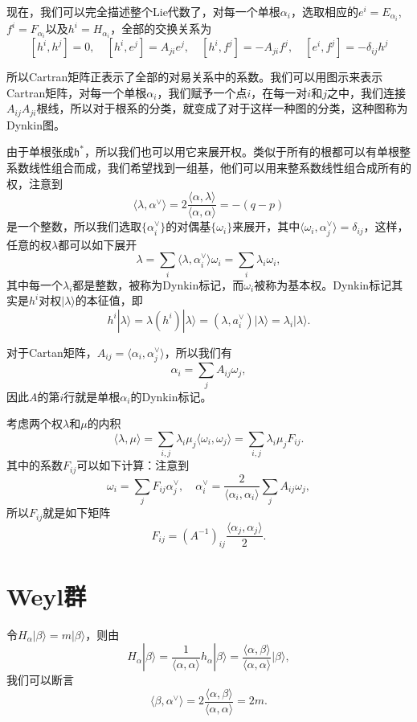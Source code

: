 \documentclass[9pt]{extarticle}
\begin{document}
\para 现在，我们可以完全描述整个Lie代数了，对每一个单根$\alpha_i$，选取相应的$e^i=E_{\alpha_i}$, $f^{i}=F_{\alpha_i}$以及$h^i=H_{\alpha_i}$，全部的交换关系为
\[
	[h^i,h^j]=0,\quad [h^i,e^j]=A_{ji}e^j,\quad [h^i,f^j]=-A_{ji}f^j,\quad [e^i,f^j]=-\delta_{ij}h^j
\]

所以Cartran矩阵正表示了全部的对易关系中的系数。我们可以用图示来表示Cartran矩阵，对每一个单根$\alpha_i$，我们赋予一个点$i$，在每一对$i$和$j$之中，我们连接$A_{ij}A_{ji}$根线，所以对于根系的分类，就变成了对于这样一种图的分类，这种图称为Dynkin图。

\para 由于单根张成$\mathfrak{h}^*$，所以我们也可以用它来展开权。类似于所有的根都可以有单根整系数线性组合而成，我们希望找到一组基，他们可以用来整系数线性组合成所有的权，注意到
\[
	\langle\lambda,\alpha^\vee\rangle=2\frac{\langle\alpha,\lambda\rangle}{\langle \alpha,\alpha\rangle}=-(q-p)
\]
是一个整数，所以我们选取$\{\alpha_i^\vee\}$的对偶基$\{\omega_i\}$来展开，其中$\langle \omega_i,\alpha_j^\vee\rangle=\delta_{ij}$，这样，任意的权$\lambda$都可以如下展开
\[
	\lambda=\sum_i \langle \lambda,\alpha_i^\vee\rangle \omega_i=\sum_i \lambda_i \omega_i,
\]
其中每一个$\lambda_i$都是整数，被称为Dynkin标记，而$\omega_i$被称为基本权。Dynkin标记其实是$h^i$对权$|\lambda \rangle$的本征值，即
\[
	h^i|\lambda \rangle=\lambda(h^i)|\lambda \rangle=(\lambda,a_i^\vee)|\lambda \rangle=\lambda_i|\lambda \rangle.
\]

对于Cartan矩阵，$A_{ij}=\langle \alpha_i,\alpha^\vee_j\rangle$，所以我们有
\[
	\alpha_i=\sum_j A_{ij}\omega_j,
\]
因此$A$的第$i$行就是单根$\alpha_i$的Dynkin标记。

\para 考虑两个权$\lambda$和$\mu$的内积
\[
	\langle \lambda,\mu\rangle=\sum_{i,j}\lambda_i\mu_j\langle \omega_i,\omega_j\rangle=\sum_{i,j}\lambda_i\mu_j F_{ij}.
\]
其中的系数$F_{ij}$可以如下计算：注意到
\[
	\omega_i=\sum_j F_{ij} \alpha_j^\vee,\quad \alpha_i^\vee=\frac{2}{\langle \alpha_i,\alpha_i\rangle}\sum_j A_{ij}\omega_j,
\]
所以$F_{ij}$就是如下矩阵
\[
	F_{ij}=(A^{-1})_{ij}\frac{\langle \alpha_j,\alpha_j\rangle}{2}.
\]

\section{Weyl群}

令$H_\alpha|\beta\rangle = m|\beta\rangle$，则由
\[
	H_\alpha|\beta\rangle = \frac{1}{\langle \alpha,\alpha \rangle}h_\alpha|\beta\rangle=\frac{\langle\alpha,\beta\rangle}{\langle \alpha,\alpha \rangle}|\beta\rangle,
\]
我们可以断言
\[
	\langle\beta,\alpha^\vee\rangle=2\frac{\langle\alpha,\beta\rangle}{\langle \alpha,\alpha\rangle}=2m.
\]
\end{document}
